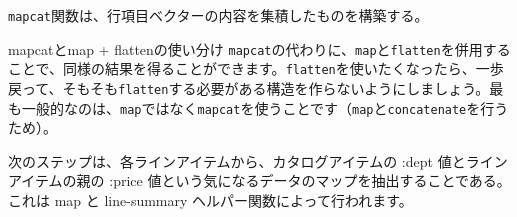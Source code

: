 \texttt{mapcat}関数は、行項目ベクターの内容を集積したものを構築する。

\begin{itembox}[l]{mapcatとmap + flattenの使い分け}
\texttt{mapcat}の代わりに、\texttt{map}と\texttt{flatten}を併用することで、同様の結果を得ることができます。\texttt{flatten}を使いたくなったら、一歩戻って、そもそも\texttt{flatten}する必要がある構造を作らないようにしましょう。最も一般的なのは、\texttt{map}ではなく\texttt{mapcat}を使うことです（\texttt{map}と\texttt{concatenate}を行うため）。
\end{itembox}

次のステップは、各ラインアイテムから、カタログアイテムの :dept 値とラインアイテムの親の :price 値という気になるデータのマップを抽出することである。これは map と line-summary ヘルパー関数によって行われます。

